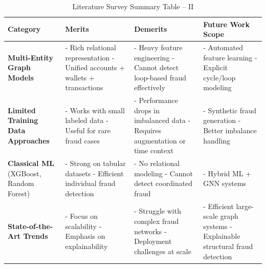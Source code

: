 \documentclass[11pt, a4paper]{article}
\begin{document}
\begin{table}[H]
    \centering
    \footnotesize
    \renewcommand{\arraystretch}{1.20}
    \begin{tabular}{|p{3.2cm}|p{3.8cm}|p{3.8cm}|p{4.2cm}|}
        \hline
        \textbf{Category} & \textbf{Merits} & \textbf{Demerits} & \textbf{Future Work Scope} \\
        \hline
        \textbf{Multi-Entity Graph Models} \cite{ieeecis2019, altman2023realistic} &
        - Rich relational representation \newline
        - Unified accounts + wallets + transactions &
        - Heavy feature engineering \newline
        - Cannot detect loop-based fraud effectively &
        - Automated feature learning \newline
        - Explicit cycle/loop modeling \\
        \hline
        \textbf{Limited Training Data Approaches} \cite{fajri2025applying} &
        - Works with small labeled data \newline
        - Useful for rare fraud cases &
        - Performance drops in imbalanced data \newline
        - Requires augmentation or time context &
        - Synthetic fraud generation \newline
        - Better imbalance handling \\
        \hline
        \textbf{Classical ML} (XGBoost, Random Forest) &
        - Strong on tabular datasets \newline
        - Efficient individual fraud detection &
        - No relational modeling \newline
        - Cannot detect coordinated fraud &
        - Hybrid ML + GNN systems \\
        \hline
        \textbf{State-of-the-Art Trends} \cite{fraudgt2023, pan20232sfgl, enhancedgnn2024, recentgnn2025, graphmethods2025} &
        - Focus on scalability \newline
        - Emphasis on explainability &
        - Struggle with complex fraud networks \newline
        - Deployment challenges at scale &
        - Efficient large-scale graph systems \newline
        - Explainable structural fraud detection \\
        \hline
    \end{tabular}
    \caption{Literature Survey Summary Table -- II}
    \label{tab:lit_survey_2}
\end{table}
\end{document}
